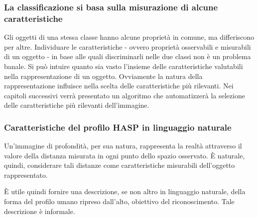             \subsubsection{La classificazione si basa sulla misurazione di alcune caratteristiche}
                Gli oggetti di una stessa classe hanno alcune proprietà in comune, ma differiscono per altre.
                Individuare le caratteristiche - ovvero proprietà osservabili e misurabili di un oggetto - in base alle quali discriminarli nelle due classi non è un problema banale.
                Si può intuire quanto sia vasto l'insieme delle caratteristiche valutabili nella rappresentazione di un oggetto.
                Ovviamente la natura della rappresentazione influisce nella scelta delle caratteristiche più rilevanti.
                Nei capitoli successivi verrà presentato un algoritmo che automatizzerà la selezione delle caratteristiche più rilevanti dell'immagine.

            \subsubsection{Caratteristiche del profilo HASP in linguaggio naturale}
                Un'immagine di profondità, per sua natura, rappresenta la realtà attraverso il valore della distanza misurata in ogni punto dello spazio osservato. È naturale, quindi, considerare tali distanze come caratteristiche misurabili dell'oggetto rappresentato.

                È utile quindi fornire una descrizione, se non altro in linguaggio naturale, della forma del profilo umano ripreso dall'alto, obiettivo del riconoscimento.
                Tale descrizione è informale.

